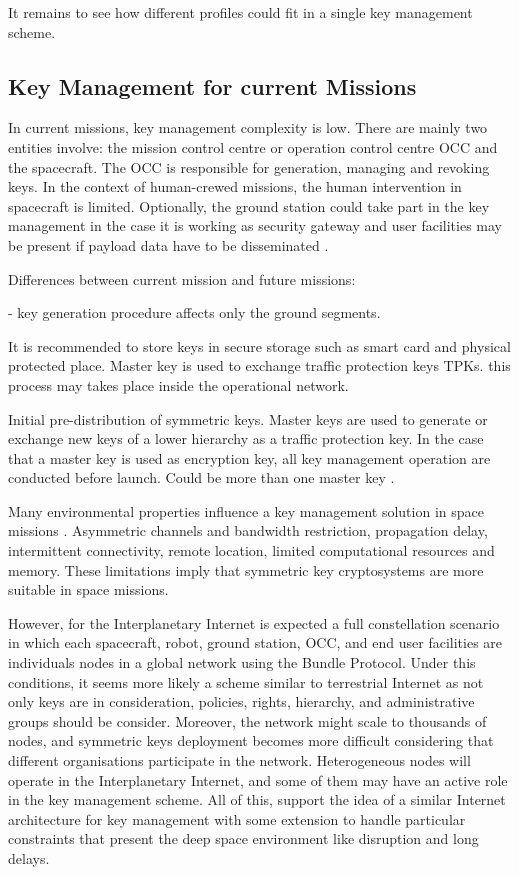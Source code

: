 It remains to see how different profiles could fit in a single key management scheme.
 



\subsection{Key Management for current Missions}

In current missions, key management complexity is low. There are mainly two entities involve: the mission control centre or operation control centre OCC and the spacecraft. The OCC is responsible for generation, managing and revoking keys. In the context of human-crewed missions, the human intervention in spacecraft is limited. Optionally, the ground station could take part in the key management in the case it is working as security gateway and user facilities may be present if payload data have to be disseminated \cite{book2011space}. 

Differences between current mission and future missions:

- key generation procedure affects only the ground segments. 

It is recommended to store keys in secure storage such as smart card and physical protected place. Master key is used to exchange traffic protection keys TPKs. this process may takes place inside the operational network. 

Initial pre-distribution of symmetric keys. Master keys are used to generate or exchange new keys of a lower hierarchy as a traffic protection key. In the case that a master key is used as encryption key, all key management operation are conducted before launch. Could be more than one master key \cite{book2011space}.

Many environmental properties influence a key management solution in space missions \cite{book2011space}. Asymmetric channels and bandwidth restriction, propagation delay, intermittent connectivity, remote location, limited computational resources and memory. These limitations imply that symmetric key cryptosystems are more suitable in space missions. 

However, for the Interplanetary Internet is expected a full constellation scenario in which each spacecraft, robot,  ground station, OCC, and end user facilities are individuals nodes in a global network using the Bundle Protocol. Under this conditions, it seems more likely a scheme similar to terrestrial Internet as not only keys are in consideration, policies, rights, hierarchy,  and administrative groups should be consider. Moreover, the network might scale to thousands of nodes, and symmetric keys deployment becomes more difficult considering that different organisations participate in the network.   Heterogeneous nodes will operate in the Interplanetary Internet, and some of them may have an active role in the key management scheme. All of this, support the idea of a similar Internet architecture for key management with some extension to handle particular constraints that present the deep space environment like disruption and long delays.  


